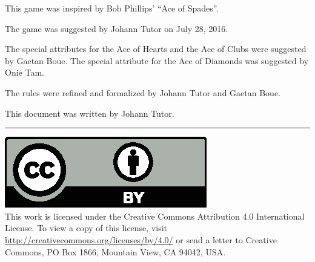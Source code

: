 \documentclass{article}
\begin{document}
This game was inspired by Bob Phillips' ``Ace of Spades''.

The game was suggested by Johann Tutor on July 28, 2016.

The special attributes for the Ace of Hearts and the Ace of Clubs were
suggested by Gaetan Boue. The special attribute for the Ace of Diamonds
was suggested by Onie Tam.

The rules were refined and formalized by Johann Tutor and Gaetan Boue.

This document was written by Johann Tutor.

\medskip
\hrule

{
  \small
  \includegraphics[scale=0.5]{cc-by.eps}\\
  This work is licensed under the Creative Commons Attribution 4.0
  International License. To view a copy of this license, visit
  \url{http://creativecommons.org/licenses/by/4.0/} or send a letter to Creative Commons, PO Box 1866, Mountain View, CA 94042, USA.
}
\end{document}
